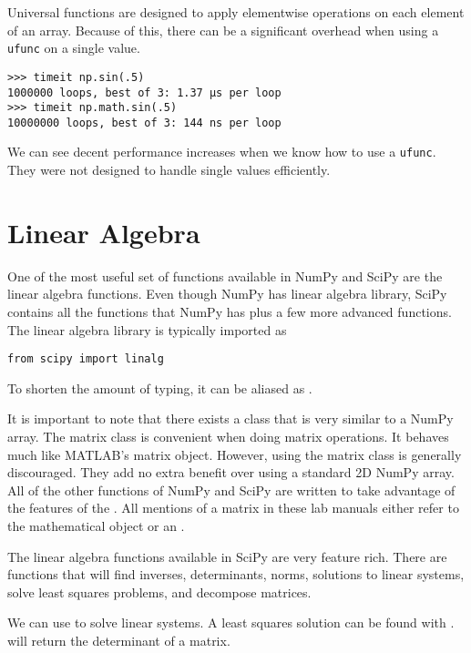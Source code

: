 Universal functions are designed to apply elementwise operations on each element of an array.
Because of this, there can be a significant overhead when using a \texttt{ufunc} on a single value.
\begin{lstlisting}
>>> timeit np.sin(.5)
1000000 loops, best of 3: 1.37 µs per loop
>>> timeit np.math.sin(.5)
10000000 loops, best of 3: 144 ns per loop
\end{lstlisting}
We can see decent performance increases when we know how to use a \texttt{ufunc}.
They were not designed to handle single values efficiently.

\section*{Linear Algebra}
One of the most useful set of functions available in NumPy and SciPy are the linear algebra functions.
Even though NumPy has linear algebra library, SciPy contains all the functions that NumPy has plus a few more advanced functions.
The linear algebra library is typically imported as
\begin{lstlisting}
from scipy import linalg
\end{lstlisting}
To shorten the amount of typing, it can be aliased as .

It is important to note that there exists a  class that is very similar to a NumPy array.  
The matrix class is convenient when doing matrix operations. 
It behaves much like MATLAB's matrix object.
However, using the matrix class is generally discouraged.  They add no extra benefit over using a standard 2D NumPy array.
All of the other functions of NumPy and SciPy are written to take advantage of the features of the .  
All mentions of a matrix in these lab manuals either refer to the mathematical object or an .

The linear algebra functions available in SciPy are very feature rich.
There are functions that will find inverses, determinants, norms, solutions to linear systems, solve least squares problems, and decompose matrices.

We can use  to solve linear systems.  A least squares solution can be found with .
 will return the determinant of a matrix.

